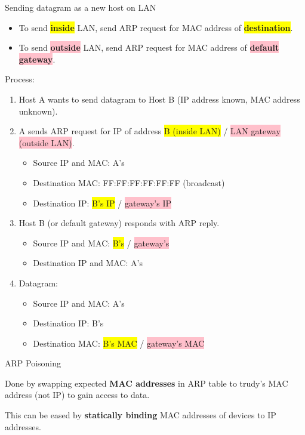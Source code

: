 \begin{theorem}
    {Sending datagram as a new host on LAN}
    \begin{itemize}
        \item To send \colorbox{yellow}{\textbf{inside}} LAN, send ARP request for MAC address of \colorbox{yellow}{\textbf{destination}}.
        \item To send \colorbox{pink}{\textbf{outside}} LAN, send ARP request for MAC address of \colorbox{pink}{\textbf{default gateway}}.
    \end{itemize}
    Process:
    \begin{enumerate}
        \item Host A wants to send datagram to Host B (IP address known, MAC address unknown).
        \item A sends ARP request for IP of address \colorbox{yellow}{B (inside LAN)} / \colorbox{pink}{LAN gateway (outside LAN)}.
              \begin{itemize}
                  \item Source IP and MAC: A's
                  \item Destination MAC: FF:FF:FF:FF:FF:FF (broadcast)
                  \item Destination IP: \colorbox{yellow}{B's IP} / \colorbox{pink}{gateway's IP}
              \end{itemize}
        \item Host B (or default gateway) responds with ARP reply.
              \begin{itemize}
                  \item Source IP and MAC: \colorbox{yellow}{B's} / \colorbox{pink}{gateway's}
                  \item Destination IP and MAC: A's
              \end{itemize}
        \item Datagram:
              \begin{itemize}
                  \item Source IP and MAC: A's
                  \item Destination IP: B's
                  \item Destination MAC: \colorbox{yellow}{B's MAC} / \colorbox{pink}{gateway's MAC}
              \end{itemize}
    \end{enumerate}
\end{theorem}

\begin{knBox}
    {ARP Poisoning}

    Done by swapping expected \textbf{MAC addresses} in ARP table to trudy's MAC address (not IP) to gain access to data.

    This can be eased by \textbf{statically binding} MAC addresses of devices to IP addresses.
\end{knBox}

